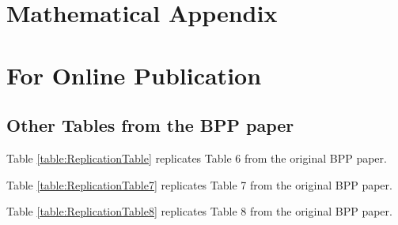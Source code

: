 \documentclass[AER]{AEA}
\begin{document}



\appendix

\section{Mathematical Appendix}

\section{For Online Publication}




\subsection{Other Tables from the BPP paper} \label{table_appendix}

Table \ref{table:ReplicationTable} replicates Table 6 from the original BPP paper.

 

Table \ref{table:ReplicationTable7} replicates Table 7 from the original BPP paper.

 

Table \ref{table:ReplicationTable8} replicates Table 8 from the original BPP paper.
\end{document}
